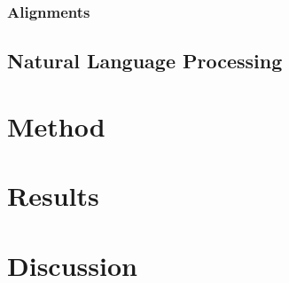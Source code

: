 \documentclass[runningheads]{template/llncs}
\begin{document}
\subsubsection{Alignments}

\subsection{Natural Language Processing}

\section{Method}

\section{Results}

\section{Discussion}

%
%
%


%
\end{document}
